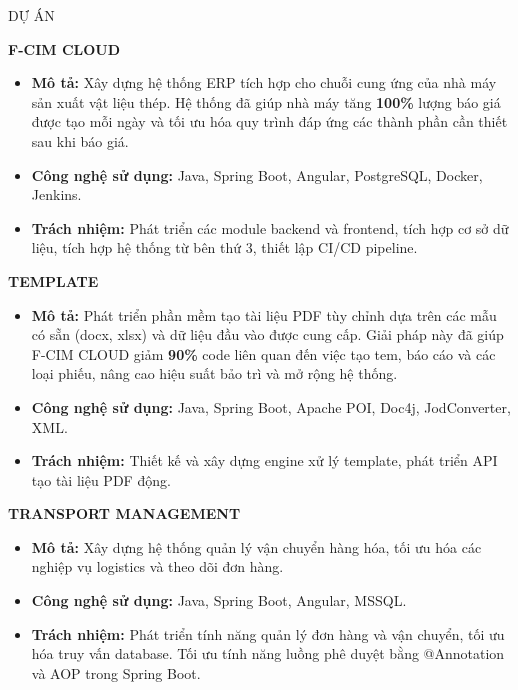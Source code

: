 \documentclass{resume}
\begin{document}
\begin{rSection}{DỰ ÁN}
\vspace{-1.25em}
\begin{samepage}
\item \textbf{F-CIM CLOUD}
\begin{itemize}
    \itemsep -3pt {}
    \item \textbf{Mô tả:} Xây dựng hệ thống ERP tích hợp cho chuỗi cung ứng của nhà máy sản xuất vật liệu thép. Hệ thống đã giúp nhà máy tăng \textbf{100\%} lượng báo giá được tạo mỗi ngày và tối ưu hóa quy trình đáp ứng các thành phần cần thiết sau khi báo giá.
    \item \textbf{Công nghệ sử dụng:} Java, Spring Boot, Angular, PostgreSQL, Docker, Jenkins.
    \item \textbf{Trách nhiệm:} Phát triển các module backend và frontend, tích hợp cơ sở dữ liệu, tích hợp hệ thống từ bên thứ 3, thiết lập CI/CD pipeline.
\end{itemize}
\end{samepage}

\begin{samepage}
\item \textbf{TEMPLATE}
\begin{itemize}
    \itemsep -3pt {}
    \item \textbf{Mô tả:} Phát triển phần mềm tạo tài liệu PDF tùy chỉnh dựa trên các mẫu có sẵn (docx, xlsx) và dữ liệu đầu vào được cung cấp. Giải pháp này đã giúp F-CIM CLOUD giảm \textbf{90\%} code liên quan đến việc tạo tem, báo cáo và các loại phiếu, nâng cao hiệu suất bảo trì và mở rộng hệ thống.
    \item \textbf{Công nghệ sử dụng:} Java, Spring Boot, Apache POI, Doc4j, JodConverter, XML.
    \item \textbf{Trách nhiệm:} Thiết kế và xây dựng engine xử lý template, phát triển API tạo tài liệu PDF động.
\end{itemize}
\end{samepage}

\begin{samepage}
\item \textbf{TRANSPORT MANAGEMENT}
\begin{itemize}
    \itemsep -3pt {}
    \item \textbf{Mô tả:} Xây dựng hệ thống quản lý vận chuyển hàng hóa, tối ưu hóa các nghiệp vụ logistics và theo dõi đơn hàng.
    \item \textbf{Công nghệ sử dụng:} Java, Spring Boot, Angular, MSSQL.
    \item \textbf{Trách nhiệm:} Phát triển tính năng quản lý đơn hàng và vận chuyển, tối ưu hóa truy vấn database. Tối ưu tính năng luồng phê duyệt bằng @Annotation và AOP trong Spring Boot.
\end{itemize}
\end{samepage}


\end{rSection}
\end{document}
